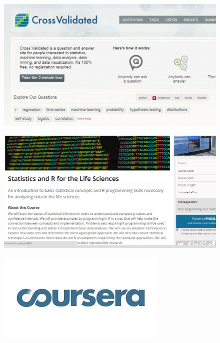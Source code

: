 \documentclass{beamer}
\begin{document}
\begin{frame}
	\begin{figure}
		\centering
		\includegraphics[width=1.05\linewidth]{crossval}
		
	\end{figure}
	
\end{frame}
\begin{frame}
	\begin{figure}
		\centering
		\includegraphics[width=1.11\linewidth]{harvardx}
		
	\end{figure}
	
\end{frame}
\begin{frame}
	\begin{figure}
		\centering
		\includegraphics[width=1.11\linewidth]{courseralogog}
		
	\end{figure}
	
\end{frame}
\end{document}
